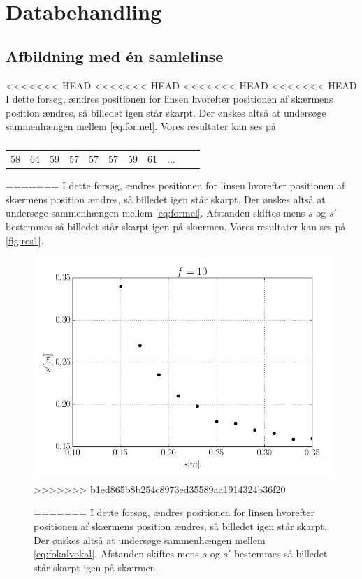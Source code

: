 \section{Databehandling}
\subsection{Afbildning med én samlelinse}
<<<<<<< HEAD
<<<<<<< HEAD
<<<<<<< HEAD
<<<<<<< HEAD
I dette forsøg, ændres positionen for linsen hvorefter positionen af skærmens position ændres, så billedet igen står skarpt. Der ønskes altså at undersøge sammenhængen mellem \cref{eq:formel}.
Vores resultater kan ses på
\begin{table}[H]
    \begin{tabular}{c|c|c|c|c|c|c|c|c|c|c}
        58 &  64 &  59 &  57 &  57 &  57  & 59  & 61  & ...
    \end{tabular}
=======
I dette forsøg, ændres positionen for linsen hvorefter positionen af skærmens position ændres, så billedet igen står skarpt. Der ønskes altså at undersøge sammenhængen mellem \cref{eq:formel}. Afstanden skiftes mens $s$ og $s'$ bestemmes så billedet står skarpt igen på skærmen.
Vores resultater kan ses på \cref{fig:res1}.
\begin{figure}[H]
    \includegraphics[width=\linewidth]{res1.png}
>>>>>>> b1ed865b8b254c8973ed35589aa1914324b36f20
    \caption{}
=======
I dette forsøg, ændres positionen for linsen hvorefter positionen af skærmens position ændres, så billedet igen står skarpt. Der ønskes altså at undersøge sammenhængen mellem \cref{eq:fokalvokal}. Afstanden skiftes mens $s$ og $s'$ bestemmes så billedet står skarpt igen på skærmen.

\end{figure}
\end{table}
